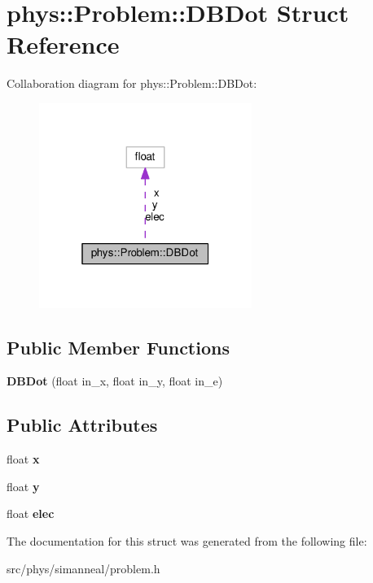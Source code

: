 \hypertarget{structphys_1_1Problem_1_1DBDot}{}\section{phys\+:\+:Problem\+:\+:D\+B\+Dot Struct Reference}
\label{structphys_1_1Problem_1_1DBDot}


Collaboration diagram for phys\+:\+:Problem\+:\+:D\+B\+Dot\+:
\nopagebreak
\begin{figure}[H]
\begin{center}
\leavevmode
\includegraphics[width=196pt]{structphys_1_1Problem_1_1DBDot__coll__graph}
\end{center}
\end{figure}
\subsection*{Public Member Functions}
\begin{DoxyCompactItemize}
\item 
{\bfseries D\+B\+Dot} (float in\+\_\+x, float in\+\_\+y, float in\+\_\+e)\hypertarget{structphys_1_1Problem_1_1DBDot_a89cf8eff17d1c919f6800b137a9afebd}{}\label{structphys_1_1Problem_1_1DBDot_a89cf8eff17d1c919f6800b137a9afebd}

\end{DoxyCompactItemize}
\subsection*{Public Attributes}
\begin{DoxyCompactItemize}
\item 
float {\bfseries x}\hypertarget{structphys_1_1Problem_1_1DBDot_a8791dcd7bc46950bdbbe994f45b32906}{}\label{structphys_1_1Problem_1_1DBDot_a8791dcd7bc46950bdbbe994f45b32906}

\item 
float {\bfseries y}\hypertarget{structphys_1_1Problem_1_1DBDot_a75b8699e5602ac448f29f857fe9cca71}{}\label{structphys_1_1Problem_1_1DBDot_a75b8699e5602ac448f29f857fe9cca71}

\item 
float {\bfseries elec}\hypertarget{structphys_1_1Problem_1_1DBDot_a9bedb33e38eb6b8cd07a78304c5f3764}{}\label{structphys_1_1Problem_1_1DBDot_a9bedb33e38eb6b8cd07a78304c5f3764}

\end{DoxyCompactItemize}


The documentation for this struct was generated from the following file\+:\begin{DoxyCompactItemize}
\item 
src/phys/simanneal/problem.\+h\end{DoxyCompactItemize}
